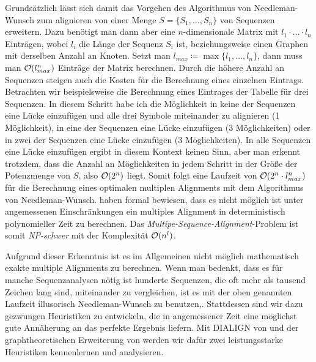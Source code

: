 Grundsätzlich lässt sich damit das Vorgehen des Algorithmus von Needleman-Wunsch zum alignieren von einer Menge $S = \{S_1,\dots,S_n\}$ von Sequenzen erweitern. Dazu benötigt man dann aber eine $n$-dimensionale Matrix mit $l_1\cdot \dots \cdot l_n$ Einträgen, wobei $l_i$ die Länge der Sequenz $S_i$ ist, beziehungsweise einen Graphen mit derselben Anzahl an Knoten. Setzt man $l_{max} \coloneqq \max\{l_1,\dots,l_n\}$, dann muss man $\mathcal{O}(l_{max}^n)$ Einträge der Matrix berechnen. Durch die höhere Anzahl an Sequenzen steigen auch die Kosten für die Berechnung eines einzelnen Eintrags. Betrachten wir beispielsweise die Berechnung eines Eintrages der Tabelle für drei Sequenzen. In diesem Schritt habe ich die Möglichkeit in keine der Sequenzen eine Lücke einzufügen und alle drei Symbole miteinander zu alignieren (1 Möglichkeit), in eine der Sequenzen eine Lücke einzufügen (3 Möglichkeiten) oder in zwei der Sequenzen eine Lücke einzufügen (3 Möglichkeiten). In alle Sequenzen eine Lücke einzufügen ergibt in diesem Kontext keinen Sinn, aber man erkennt trotzdem, dass die Anzahl an Möglichkeiten in jedem Schritt in der Größe der Potenzmenge von $S$, also $\mathcal{O}(2^n)$ liegt. Somit folgt eine Laufzeit von $\mathcal{O}(2^n\cdot l_{max}^n)$ für die Berechnung eines optimalen multiplen Alignments mit dem Algorithmus von Needleman-Wunsch. \cite{wj94} haben formal bewiesen, dass es nicht möglich ist unter angemessenen Einschränkungen ein multiples Alignment in deterministisch polynomieller Zeit zu berechnen. Das \emph{Multipe-Sequence-Alignment}-Problem ist somit \emph{NP-schwer} mit der Komplexität $\mathcal{O}(n^l)$.

Aufgrund dieser Erkenntnis ist es im Allgemeinen nicht möglich mathematisch exakte multiple Alignments zu berechnen. Wenn man bedenkt, dass es für manche Sequenzanalysen nötig ist hunderte Sequenzen, die oft mehr als tausend Zeichen lang sind, miteinander zu vergleichen, ist es mit der oben genannten Laufzeit illusorisch Needleman-Wunsch zu benutzen,. Stattdessen sind wir dazu gezwungen Heuristiken zu entwickeln, die in angemessener Zeit eine möglichst gute Annäherung an das perfekte Ergebnis liefern. Mit DIALIGN von \cite{mdw96} und der graphtheoretischen Erweiterung von \cite{cpm10} werden wir dafür zwei leistungsstarke Heuristiken kennenlernen und analysieren.










